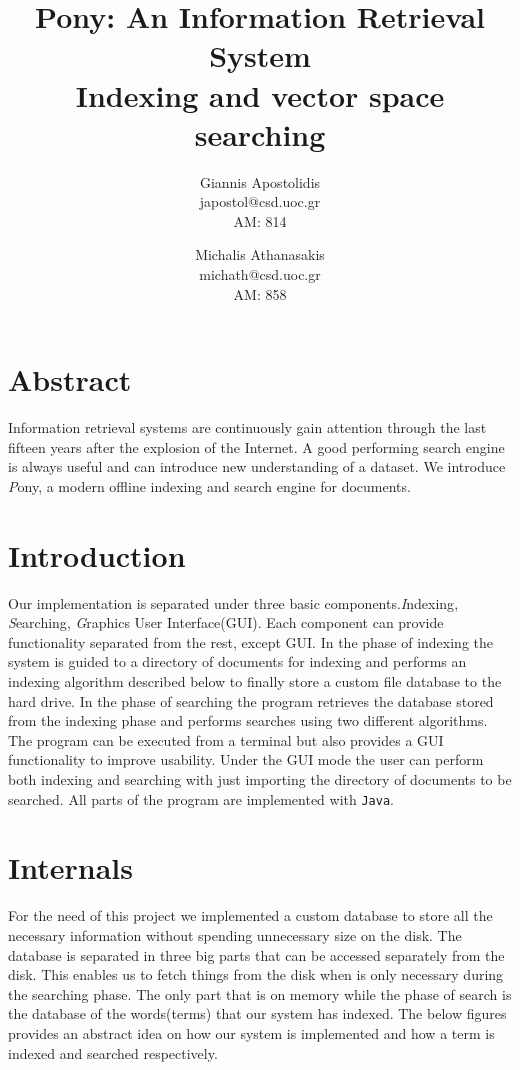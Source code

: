 \documentclass[letterpaper,twocolumn,10pt]{article}
\begin{document}
\date{}

\title{\Large Pony: An Information Retrieval System \\ \small Indexing and vector space searching}


\author{{\rm Giannis Apostolidis}\\
				{\rm japostol@csd.uoc.gr}\\
				{\rm AM: 814}\\
				\and
				{\rm Michalis Athanasakis}\\
				{\rm michath@csd.uoc.gr}\\
				{\rm AM: 858}\\
}
\maketitle
\section{Abstract}
Information retrieval systems are continuously gain attention through the last fifteen years after the explosion of the Internet. A good performing search engine is always useful and can introduce new understanding of a dataset. We introduce {\emph Pony}, a modern offline indexing and search engine for documents.

\section{Introduction}
Our implementation is separated under three basic components.{\emph Indexing}, {\emph Searching}, {\emph Graphics User Interface}(GUI). Each component can provide functionality separated from the rest, except GUI. In the phase of indexing the system is guided to a directory of documents for indexing and performs an indexing algorithm described below to finally store a custom file database to the hard drive. In the phase of searching the program retrieves the database stored from the indexing phase and performs searches using two different algorithms. The program can be executed from a terminal but also provides a GUI functionality to improve usability. Under the GUI mode the user can perform both indexing and searching with just importing the directory of documents to be searched. All parts of the program are implemented with {\tt Java}.

\section{Internals}
For the need of this project we implemented a custom database to store all the necessary information without spending unnecessary size on the disk. The database is separated in three big parts that can be accessed separately from the disk. This enables us to fetch things from the disk when is only necessary during the searching phase. The only part that is on memory while the phase of search is the database of the words(terms) that our system has indexed. The below figures provides an abstract idea on how our system is implemented and how a term is indexed and searched respectively.
\end{document}
